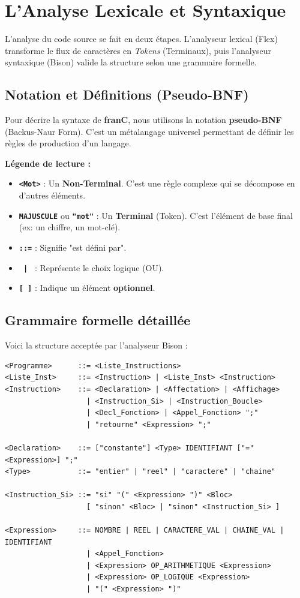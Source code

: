 \documentclass[pfe ,titlesmallcaps]{isi_report}
\begin{document}
\section{L'Analyse Lexicale et Syntaxique}
L'analyse du code source se fait en deux étapes. L'analyseur lexical (Flex) transforme le flux de caractères en \textit{Tokens} (Terminaux), puis l'analyseur syntaxique (Bison) valide la structure selon une grammaire formelle.

\subsection{Notation et Définitions (Pseudo-BNF)}
Pour décrire la syntaxe de \textbf{franC}, nous utilisons la notation \textbf{pseudo-BNF} (Backus-Naur Form). C'est un métalangage universel permettant de définir les règles de production d'un langage.

\textbf{Légende de lecture :}
\begin{itemize}
	\item \textbf{\texttt{<Mot>}} : Un \textbf{Non-Terminal}. C'est une règle complexe qui se décompose en d'autres éléments.
	\item \textbf{\texttt{MAJUSCULE}} ou \textbf{\texttt{"mot"}} : Un \textbf{Terminal} (Token). C'est l'élément de base final (ex: un chiffre, un mot-clé).
	\item \textbf{\texttt{::=}} : Signifie "est défini par".
	\item \textbf{\texttt{ | }} : Représente le choix logique (OU).
	\item \textbf{\texttt{[ ]}} : Indique un élément \textbf{optionnel}.
\end{itemize}

\subsection{Grammaire formelle détaillée}
Voici la structure acceptée par l'analyseur Bison :

\begin{verbatim}
<Programme>      ::= <Liste_Instructions>
<Liste_Inst>     ::= <Instruction> | <Liste_Inst> <Instruction>
<Instruction>    ::= <Declaration> | <Affectation> | <Affichage> 
                   | <Instruction_Si> | <Instruction_Boucle> 
                   | <Decl_Fonction> | <Appel_Fonction> ";" 
                   | "retourne" <Expression> ";"

<Declaration>    ::= ["constante"] <Type> IDENTIFIANT ["=" <Expression>] ";"
<Type>           ::= "entier" | "reel" | "caractere" | "chaine"

<Instruction_Si> ::= "si" "(" <Expression> ")" <Bloc> 
                   [ "sinon" <Bloc> | "sinon" <Instruction_Si> ]

<Expression>     ::= NOMBRE | REEL | CARACTERE_VAL | CHAINE_VAL | IDENTIFIANT
                   | <Appel_Fonction>
                   | <Expression> OP_ARITHMETIQUE <Expression>
                   | <Expression> OP_LOGIQUE <Expression>
                   | "(" <Expression> ")"
\end{verbatim}
\end{document}
